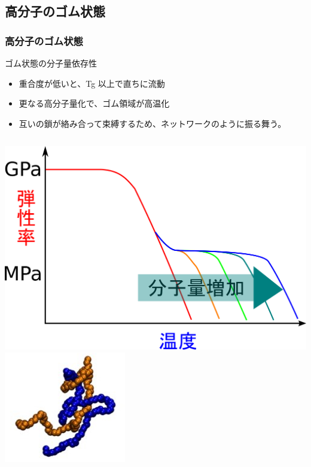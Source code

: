 \documentclass[unicode,12pt]{beamer}%
\begin{document}
\subsection{高分子のゴム状態}
\begin{frame}
	\frametitle{高分子のゴム状態}
			\begin{exampleblock}{ゴム状態の分子量依存性}
				\begin{itemize}
					\item 重合度が低いと、Tg 以上で直ちに流動
					\item 更なる高分子量化で、ゴム領域が高温化
					\item 互いの鎖が絡み合って束縛するため、ネットワークのように振る舞う。
				\end{itemize}
			\end{exampleblock}
			\vspace{3mm}
			\begin{columns}[c, onlytextwidth]
					\centering
					\includegraphics[width=.9\textwidth]{polymer_spectrum_2.png}
				\centering
				\includegraphics[width=.8\textwidth]{karamiai.png}
			\end{columns}
\end{frame}
\end{document}
